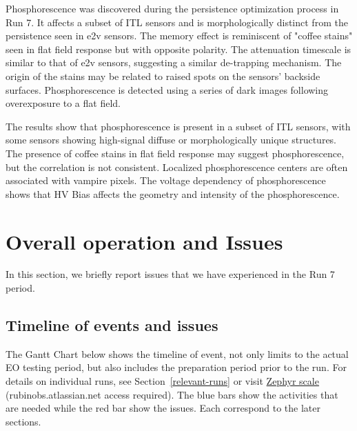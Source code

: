 Phosphorescence was discovered during the persistence optimization process in Run 7. It affects a subset of ITL sensors and is morphologically distinct from the persistence seen in e2v sensors. The memory effect is reminiscent of "coffee stains" seen in flat field response but with opposite polarity. The attenuation timescale is similar to that of e2v sensors, suggesting a similar de-trapping mechanism. The origin of the stains may be related to raised spots on the sensors' backside surfaces. Phosphorescence is detected using a series of dark images following overexposure to a flat field. 

The results show that phosphorescence is present in a subset of ITL sensors, with some sensors showing high-signal diffuse or morphologically unique structures. The presence of coffee stains in flat field response may suggest phosphorescence, but the correlation is not consistent. Localized phosphorescence centers are often associated with vampire pixels. The voltage dependency of phosphorescence shows that HV Bias affects the geometry and intensity of the phosphorescence.

\clearpage

\section{Overall operation and Issues}\label{sec:issues}
In this section, we briefly report issues that we have experienced in the Run 7 period.

\subsection{Timeline of events and issues}\label{ganttchart}

The Gantt Chart below shows the timeline of event, not only limits to the actual EO testing period, but also includes the preparation period prior to the run. For details on individual runs, see Section~\ref{relevant-runs} or visit \href{https://rubinobs.atlassian.net/projects/BLOCK?selectedItem=com.atlassian.plugins.atlassian-connect-plugin:com.kanoah.test-manager__main-project-page#!/reports/testresults/list/view?tql=testResult.projectId%20IN%20(10064)%20AND%20testPlan.key%20IN%20(%22BLOCK-P15%22)%20AND%20testPlan.onlyLastTestResult%20IS%20true&epicJQL=&title=Test%20execution%20results%20(list)&projectId=10064&traceabilityReportOption=COVERAGE_TEST_CASES&traceabilityTreeOption=COVERAGE_TEST_CASES&traceabilityCustomTreeDisplayOption=CONDENSED&traceabilityMatrixOption=COVERAGE_TEST_CASES&scorecardOption=EXECUTION_RESULTS&displayUnit=COUNT&period=MONTH}{Zephyr scale} (rubinobs.atlassian.net access required).
The blue bars show the activities that are needed while the red bar show the issues. Each correspond to the later sections.

